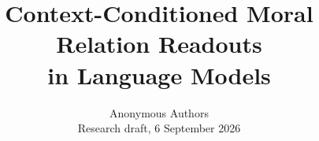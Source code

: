 \documentclass[10pt]{article}
\title{Context-Conditioned Moral Relation Readouts\\in Language Models}
\author{Anonymous Authors\\Research draft, 6 September 2026}
\begin{document}
\maketitle
\begin{abstract}

\end{abstract}

\end{document}
